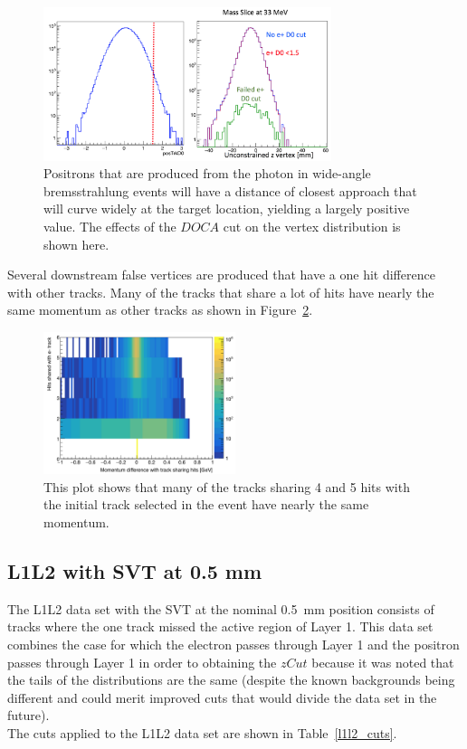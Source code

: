 \begin{figure}[H]
  \centering
      \includegraphics[width=0.75\textwidth]{pics/searching/docacut.png}
  \caption[Cut effect on the postiron $DOCA$]{Positrons that are produced from the photon in wide-angle bremsstrahlung events will have a distance of closest approach that will curve widely at the target location, yielding a largely positive value. The effects of the $DOCA$ cut on the vertex distribution is shown here.}
  \label{fig:docacuteffect}
\end{figure} 
Several downstream false vertices are produced that have a one hit difference with other tracks. Many of the tracks that share a lot of hits have nearly the same momentum as other tracks as shown in Figure~\ref{fig:trkshare}.
\begin{figure}[H]
  \centering
      \includegraphics[width=0.5\textwidth]{pics/searching/TrkShareHits.png}
  \caption[Cut on shared hits between tracks]{This plot shows that many of the tracks sharing 4 and 5 hits with the initial track selected in the event have nearly the same momentum.}
  \label{fig:trkshare}
\end{figure} 

\subsection{L1L2 with SVT at 0.5 mm}

The L1L2 data set with the SVT at the nominal 0.5~mm position consists of tracks where the one track missed the active region of Layer 1. This data set combines the case for which the electron passes through Layer 1 and the positron passes through Layer 1 in order to obtaining the $zCut$ because it was noted that the tails of the distributions are the same (despite the known backgrounds being different and could merit improved cuts that would divide the data set in the future). \\
\indent The cuts applied to the L1L2 data set are shown in Table~\ref{l1l2_cuts}. 

